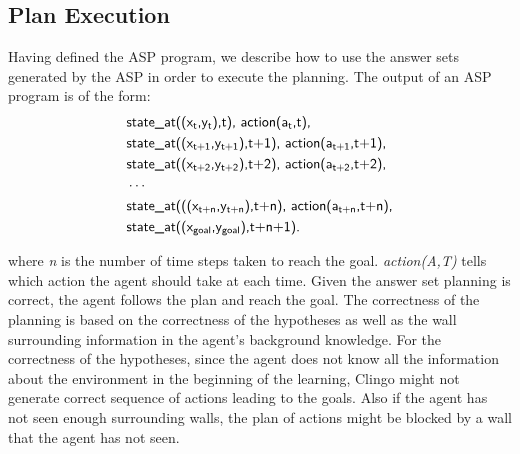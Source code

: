 \subsection{Plan Execution}
\label{subsec:plan_execution}
Having defined the ASP program, we describe how to use the answer sets generated by the ASP in order to execute the planning.
The output of an ASP program is of the form:
\begin{equation}
\begin{split}
&\textsf{state\_at((x\textsubscript{t},y\textsubscript{t}),t), action(a\textsubscript{t},t),}\\
&\textsf{state\_at((x\textsubscript{t+1},y\textsubscript{t+1}),t+1), action(a\textsubscript{t+1},t+1),}\\
&\textsf{state\_at((x\textsubscript{t+2},y\textsubscript{t+2}),t+2), action(a\textsubscript{t+2},t+2),}\\
&\cdots\\
&\textsf{state\_at(((x\textsubscript{t+n},y\textsubscript{t+n}),t+n), action(a\textsubscript{t+n},t+n),}\\
&\textsf{state\_at((x\textsubscript{goal},y\textsubscript{goal}),t+n+1).} 
\end{split}
\end{equation}

where \textit{n} is the number of time steps taken to reach the goal. 
\textit{action(A,T)} tells which action the agent should take at each time.
Given the answer set planning is correct, the agent follows the plan and reach the goal. 
The correctness of the planning is based on the correctness of the hypotheses as well as the wall surrounding information in the agent's background knowledge. 
For the correctness of the hypotheses, since the agent does not know all the information about the environment in the beginning of the learning,   
Clingo might not generate correct sequence of actions leading to the goals.
Also if the agent has not seen enough surrounding walls, the plan of actions might be blocked by a wall that the agent has not seen. 

